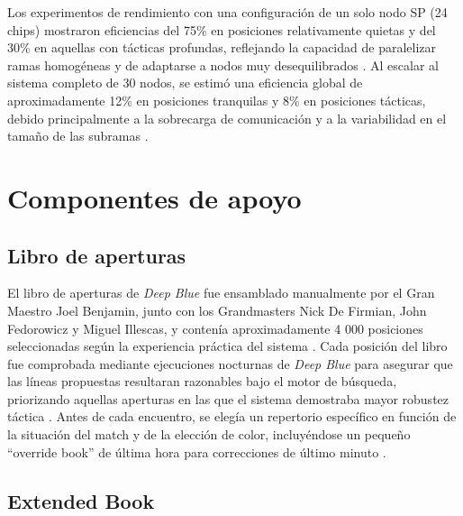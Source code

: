 \documentclass[a4paper, 12pt]{article}
\begin{document}
Los experimentos de rendimiento con una configuración de un solo 
nodo SP (24 chips) mostraron eficiencias del 75\% en posiciones 
relativamente quietas y del 30\% en aquellas con tácticas 
profundas, reflejando la capacidad de paralelizar ramas 
homogéneas y de adaptarse a nodos muy desequilibrados 
\cite{Campbell2002}. Al escalar al sistema completo de 30 nodos, 
se estimó una eficiencia global de aproximadamente 12\% en 
posiciones tranquilas y 8\% en posiciones tácticas, debido 
principalmente a la sobrecarga de comunicación y a la 
variabilidad en el tamaño de las subramas \cite{Campbell2002}.




















\section{Componentes de apoyo}

\subsection{Libro de aperturas}

El libro de aperturas de \textit{Deep Blue} fue ensamblado 
manualmente por el Gran Maestro Joel Benjamin, junto con los 
Grandmasters Nick De Firmian, John Fedorowicz y Miguel Illescas, 
y contenía aproximadamente 4 000 posiciones seleccionadas según 
la experiencia práctica del sistema \cite{Campbell2002}. Cada 
posición del libro fue comprobada mediante ejecuciones nocturnas 
de \textit{Deep Blue} para asegurar que las líneas propuestas 
resultaran razonables bajo el motor de búsqueda, priorizando 
aquellas aperturas en las que el sistema demostraba mayor 
robustez táctica \cite{Campbell2002}. Antes de cada encuentro, 
se elegía un repertorio específico en función de la situación 
del match y de la elección de color, incluyéndose un pequeño 
“override book” de última hora para correcciones de último 
minuto \cite{Campbell2002}.

\subsection{Extended Book}
\end{document}
